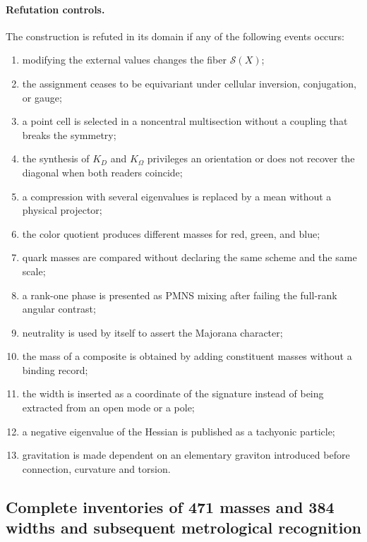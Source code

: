 \paragraph{Refutation controls.}

The construction is refuted in its domain if any of the following events occurs:

\begin{enumerate}
\item modifying the external values changes the fiber \(\mathscr S(X)\);
\item the assignment ceases to be equivariant under cellular inversion,
      conjugation, or gauge;
\item a point cell is selected in a noncentral multisection without a
      coupling that breaks the symmetry;
\item the synthesis of \(K_D\) and \(K_\Omega\) privileges an orientation or does not
      recover the diagonal when both readers coincide;
\item a compression with several eigenvalues is replaced by a mean without
      a physical projector;
\item the color quotient produces different masses for red, green, and blue;
\item quark masses are compared without declaring the same scheme and the same scale;
\item a rank-one phase is presented as PMNS mixing after failing the
      full-rank angular contrast;
\item neutrality is used by itself to assert the Majorana character;
\item the mass of a composite is obtained by adding constituent masses without
      a binding record;
\item the width is inserted as a coordinate of the signature instead of being extracted from
      an open mode or a pole;
\item a negative eigenvalue of the Hessian is published as a tachyonic particle;
\item gravitation is made dependent on an elementary graviton introduced
      before connection, curvature and torsion.
\end{enumerate}

\subsection{Complete inventories of 471 masses and 384 widths and subsequent metrological recognition}

